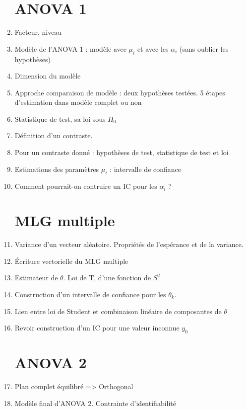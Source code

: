 \documentclass{article}
\begin{document}
\begin{enumerate}
\section{ANOVA 1}
\item Facteur, niveau
\item Modèle de l'ANOVA 1 : modèle avec $\mu_i$ et avec les $\alpha_i$ (sans oublier les hypothèses)
\item Dimension du modèle
\item Approche comparaison de modèle : deux hypothèses testées. 5 étapes d'estimation dans modèle complet ou non
\item Statistique de test, sa loi sous $H_0$
\item Définition d'un contraste. 
\item Pour un contraste donné : hypothèses de test, statistique de test et loi
\item Estimations des paramètres $\mu_i$ : intervalle de confiance
\item Comment pourrait-on contruire un IC pour les $\alpha_i$ ?
\section{MLG multiple}
\item Variance d'un vecteur aléatoire. Propriétés de l'espérance et de la variance.
\item Écriture vectorielle du MLG multiple
\item Estimateur de $\theta$. Loi de T, d'une fonction de $S^2$
\item Construction d'un intervalle de confiance pour les $\theta_k$.
\item Lien entre loi de Student et combinaison linéaire de composantes de $\theta$
\item Revoir construction d'un IC pour une valeur inconnue $y_0$
\section{ANOVA 2}
\item Plan complet équilibré => Orthogonal
\item Modèle final d'ANOVA 2. Contrainte d'identifiabilité
\end{enumerate}
\end{document}
